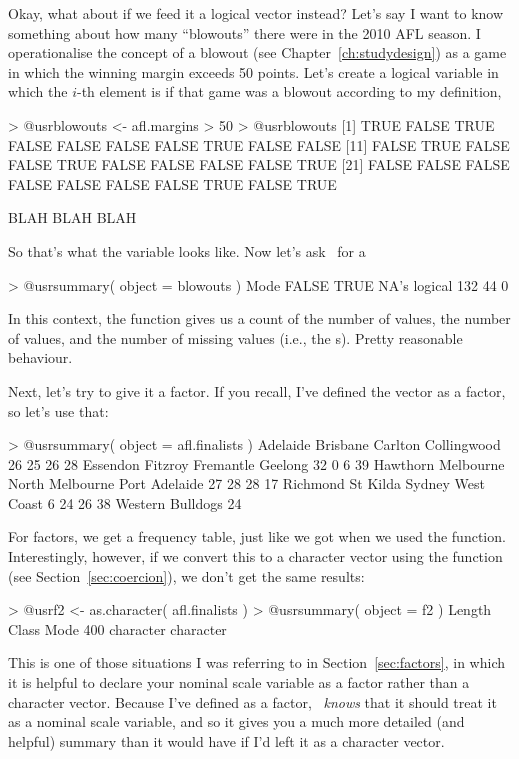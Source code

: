 Okay, what about if we feed it a logical vector instead? Let's say I want to know something about how many ``blowouts'' there were in the 2010 AFL season. I operationalise the concept of a blowout (see Chapter~\ref{ch:studydesign}) as a game in which the winning margin exceeds 50 points. Let's create a logical variable  in which the $i$-th element is  if that game was a blowout according to my definition, 
\begin{rblock1}
> @usr{blowouts <-  afl.margins > 50}
> @usr{blowouts}
  [1]  TRUE FALSE  TRUE FALSE FALSE FALSE FALSE  TRUE FALSE FALSE
 [11] FALSE  TRUE FALSE FALSE  TRUE FALSE FALSE FALSE FALSE  TRUE
 [21] FALSE FALSE FALSE FALSE FALSE FALSE FALSE  TRUE FALSE  TRUE
 
  BLAH BLAH BLAH
\end{rblock1}
So that's what the  variable looks like. Now let's ask \R\ for a  
\begin{rblock1}
> @usr{summary( object = blowouts )}
   Mode   FALSE    TRUE    NA's 
logical     132      44       0 
\end{rblock1}
In this context, the  function gives us a count of the number of  values, the number of  values, and the number of missing values (i.e., the s). Pretty reasonable behaviour. 

Next, let's try to give it a factor. If you recall, I've defined the  vector as a factor, so let's use that:
\begin{rblock1}
> @usr{summary( object = afl.finalists )}
        Adelaide         Brisbane          Carlton      Collingwood 
              26               25               26               28 
        Essendon          Fitzroy        Fremantle          Geelong 
              32                0                6               39 
        Hawthorn        Melbourne  North Melbourne    Port Adelaide 
              27               28               28               17 
        Richmond         St Kilda           Sydney       West Coast 
               6               24               26               38 
Western Bulldogs 
              24 
\end{rblock1}
For factors, we get a frequency table, just like we got when we used the  function. Interestingly, however, if we convert this to a character vector using the  function (see Section~\ref{sec:coercion}), we don't get the same results:
\begin{rblock1}
> @usr{f2 <- as.character( afl.finalists )}
> @usr{summary( object = f2 )}
   Length     Class      Mode 
      400 character character 
\end{rblock1}
This is one of those situations I was referring to in Section~\ref{sec:factors}, in which it is helpful to declare your nominal scale variable as a factor rather than a character vector. Because I've defined  as a factor, \R\ {\it knows} that it should treat it as a nominal scale variable, and so it gives you a much more detailed (and helpful) summary than it would have if I'd left it as a character vector.



